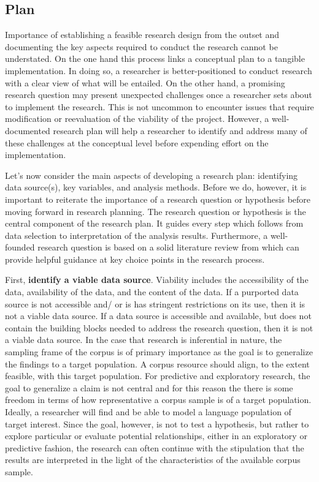 \documentclass[
  letterpaper,
  DIV=11,
  numbers=noendperiod]{scrreport}
\theoremstyle{definition}
\theoremstyle{remark}
\begin{document}
\hypertarget{sec-fr-plan}{%
\subsection{Plan}\label{sec-fr-plan}}

Importance of establishing a feasible research design from the outset
and documenting the key aspects required to conduct the research cannot
be understated. On the one hand this process links a conceptual plan to
a tangible implementation. In doing so, a researcher is
better-positioned to conduct research with a clear view of what will be
entailed. On the other hand, a promising research question may present
unexpected challenges once a researcher sets about to implement the
research. This is not uncommon to encounter issues that require
modification or reevaluation of the viability of the project. However, a
well-documented research plan will help a researcher to identify and
address many of these challenges at the conceptual level before
expending effort on the implementation.

Let's now consider the main aspects of developing a research plan:
identifying data source(s), key variables, and analysis methods. Before
we do, however, it is important to reiterate the importance of a
research question or hypothesis before moving forward in research
planning. The research question or hypothesis is the central component
of the research plan. It guides every step which follows from data
selection to interpretation of the analysis results. Furthermore, a
well-founded research question is based on a solid literature review
from which can provide helpful guidance at key choice points in the
research process.

First, \textbf{identify a viable data source}. Viability includes the
accessibility of the data, availability of the data, and the content of
the data. If a purported data source is not accessible and/ or is has
stringent restrictions on its use, then it is not a viable data source.
If a data source is accessible and available, but does not contain the
building blocks needed to address the research question, then it is not
a viable data source. In the case that research is inferential in
nature, the sampling frame of the corpus is of primary importance as the
goal is to generalize the findings to a target population. A corpus
resource should align, to the extent feasible, with this target
population. For predictive and exploratory research, the goal to
generalize a claim is not central and for this reason the there is some
freedom in terms of how representative a corpus sample is of a target
population. Ideally, a researcher will find and be able to model a
language population of target interest. Since the goal, however, is not
to test a hypothesis, but rather to explore particular or evaluate
potential relationships, either in an exploratory or predictive fashion,
the research can often continue with the stipulation that the results
are interpreted in the light of the characteristics of the available
corpus sample.
\end{document}
